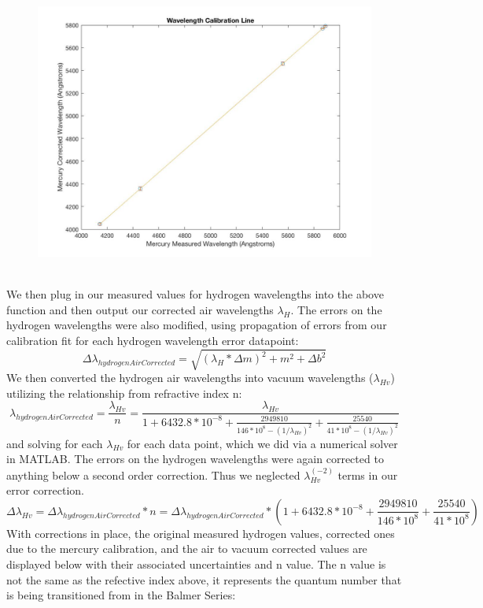 \documentclass{article}
\begin{document}
    \begin{figure}[H]
    \centering
    \includegraphics[scale = 0.2]{ATMi.jpg}
    \caption{}
    \label{fig:my_label}
\end{figure}
    \\\indent We then plug in our measured values for hydrogen wavelengths into the above function and then output our corrected air wavelengths $\lambda_H$. The errors on the hydrogen wavelengths were also modified, using propagation of errors from our calibration fit for each hydrogen wavelength error datapoint:
    \begin{equation}
        \Delta \lambda_{hydrogenAirCorrected} = \sqrt{(\lambda_H*\Delta m)^2 + m^2 + \Delta b ^2}
    \end{equation}
    We then converted the hydrogen air wavelengths into vacuum wavelengths ($\lambda_{Hv}$) utilizing the relationship from refractive index n:
    \begin{equation}
        \lambda_{hydrogenAirCorrected} = \frac{\lambda_{Hv}}{n} = \frac{\lambda_{Hv}}{1 + 6432.8*10^{-8} + \frac{2949810}{146*10^8 - (1/\lambda_{Hv})^2} + \frac{25540}{41*10^8 - (1/\lambda_{Hv})^2}}
    \end{equation}
    and solving for each $\lambda_{Hv}$ for each data point, which we did via a numerical solver in MATLAB. The errors on the hydrogen wavelengths were again corrected to anything below a second order correction. Thus we neglected $\lambda_{Hv}^(-2)$ terms in our error correction.
    \begin{equation}
        \Delta \lambda_{Hv} = \Delta \lambda_{hydrogenAirCorrected} * n =\Delta \lambda_{hydrogenAirCorrected} * (1 + 6432.8*10^{-8} + \frac{2949810}{146*10^8} + \frac{25540}{41*10^8})
    \end{equation}
    With corrections in place, the original measured hydrogen values, corrected ones due to the mercury calibration, and the air to vacuum corrected values are displayed below with their associated uncertainties and n value. The n value is not the same as the refective index above, it represents the quantum number that is being transitioned from in the Balmer Series:
   
\end{document}
